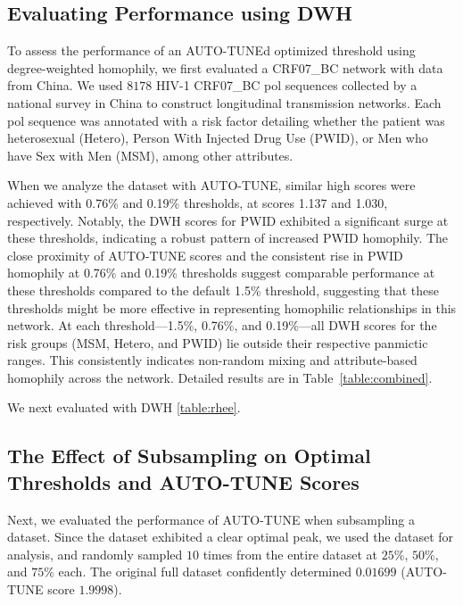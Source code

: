 \documentclass[utf8]{FrontiersinHarvard} %
\newcommand{\TODO}[1]{{\color{red}{#1}}}
\begin{document}
\subsection{Evaluating Performance using DWH}

\TODO{need to better articulate WHY we think that higher DWH is *desirable*}

To assess the performance of an AUTO-TUNEd optimized threshold using
degree-weighted homophily, we first evaluated a CRF07\_BC network with data
from China. We used $8178$ HIV-1 CRF07\_BC pol sequences collected by a
national survey in China to construct longitudinal transmission networks. Each
pol sequence was annotated with a risk factor detailing whether the patient was
heterosexual (Hetero), Person With Injected Drug Use (PWID), or Men who have
Sex with Men (MSM), among other attributes. 

When we analyze the dataset with AUTO-TUNE, similar high scores were achieved
with 0.76\% and 0.19\% thresholds, at scores 1.137 and 1.030, respectively.
Notably, the DWH scores for PWID exhibited a significant surge at these
thresholds, indicating a robust pattern of increased PWID homophily. The close
proximity of AUTO-TUNE scores and the consistent rise in PWID homophily at
0.76\% and 0.19\% thresholds suggest comparable performance at these thresholds
compared to the default 1.5\% threshold, suggesting that these thresholds might
be more effective in representing homophilic relationships in this network. At
each threshold—1.5\%, 0.76\%, and 0.19\%—all DWH scores for the risk groups
(MSM, Hetero, and PWID) lie outside their respective panmictic ranges. This
consistently indicates non-random mixing and attribute-based homophily across
the network. Detailed results are in Table~\ref{table:combined}. 

We next evaluated \citep{rhee_national_2019} with DWH \ref{table:rhee}.
\label{fig:scoreAbove2}


\subsection{The Effect of Subsampling on Optimal Thresholds and AUTO-TUNE Scores}

\TODO{Also should include some motivation}

Next, we evaluated the performance of AUTO-TUNE when subsampling a dataset.
Since the \citep{rhee_national_2019} dataset exhibited a clear optimal peak, we
used the dataset for analysis, and randomly sampled $10$ times from the entire
dataset at $25\%$, $50\%$, and $75\%$ each. The original full dataset
confidently determined $0.01699$ (AUTO-TUNE score $1.9998$).
\end{document}
